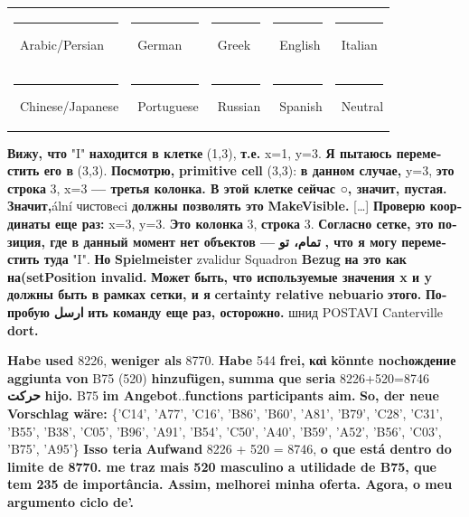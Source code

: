 \documentclass{article}
\newcommand{\car}[1]{\textbf{\textcolor{Arabic}{\textarabic{#1}}}}
\newcommand{\cen}[1]{\textbf{\textcolor{English}{#1}}}
\newcommand{\cde}[1]{\textbf{\textcolor{German}{#1}}}
\newcommand{\czh}[1]{\textbf{\textcolor{Chinese}{\textchinese{#1}}}}
\newcommand{\cru}[1]{\textbf{\textcolor{Russian}{\textrussian{#1}}}}
\newcommand{\cgr}[1]{\textbf{\textcolor{Greek}{\textgreek{#1}}}}
\newcommand{\cit}[1]{\textbf{\textcolor{Italian}{#1}}}
\newcommand{\ces}[1]{\textbf{\textcolor{Spanish}{#1}}}
\newcommand{\cpt}[1]{\textbf{\textcolor{Portuguese}{#1}}}
\newcommand{\cunc}[1]{\textcolor{Unclear}{#1}}
\begin{document}
\raggedright

\begin{tcolorbox}[colframe=gray!40,colback=white,
                  boxrule=0.5pt,arc=4pt,auto outer arc,
                  left=6pt,right=6pt,top=4pt,bottom=4pt]
\centering

\begin{tabular}{l l l l l}
    \textcolor{Arabic}{\rule{.9em}{.9em}}~Arabic/Persian & 
    \textcolor{German}{\rule{.9em}{.9em}}~German &
    \textcolor{Greek}{\rule{.9em}{.9em}}~Greek &
    \textcolor{English}{\rule{.9em}{.9em}}~English &
    \textcolor{Italian}{\rule{.9em}{.9em}}~Italian \\
    \textcolor{Chinese}{\rule{.9em}{.9em}}~Chinese/Japanese &
    \textcolor{Portuguese}{\rule{.9em}{.9em}}~Portuguese &
    \textcolor{Russian}{\rule{.9em}{.9em}}~Russian &
    \textcolor{Spanish}{\rule{.9em}{.9em}}~Spanish &
    \textcolor{Neutral}{\rule{.9em}{.9em}}~Neutral \\
\end{tabular}
\end{tcolorbox}


\newpage
\color{Neutral}
\cru{Вижу, что} "I" \cru{находится в клетке} (1,3), \cru{т.е.} x=1, y=3. \cru{Я пытаюсь переместить его в} (3,3). 
\cru{Посмотрю,} \cen{primitive cell} (3,3): \cru{в данном случае,} y=3, \cru{это строка} 3, x=3 \cru{— третья колонка. В этой клетке сейчас ○, значит, пустая. Значит,}\cunc{ální \textrussian{чистов}eci} \cru{должны позволять это} \cen{MakeVisible.} […]
\cru{Проверю координаты еще раз:} x=3, y=3. \cru{Это колонка} 3, \cru{строка} 3. \cru{Согласно сетке, это позиция, где в данный момент нет объектов —} \car{تمام، تو} \cru{, что я могу переместить туда} "I".  
\cru{Но} \cde{Spielmeister} \cunc{zvalidur Squadron} \cde{Bezug} \cru{на это как на(}\cen{setPosition invalid.} \cru{Может быть, что используемые значения x и y должны быть в рамках сетки, и я} \cen{certainty relative nebuario} \cru{этого.}  
\cru{Попробую} \car{ارسل} \cru{ить команду еще раз, осторожно.}  
\cunc{\textrussian{шнид} POSTAVI Canterville} \czh{確認} \cen{dort.}

\newpage
\color{Neutral}
\cde{Habe} \cen{used} 8226, \cde{weniger als} 8770. \cde{Habe} 544 \cde{frei,} \cgr{καὶ} \cde{könnte noch}\cru{ождение} \cit{aggiunta} \cde{von} B75 (520) \cde{hinzufügen,} \cpt{summa que seria} 8226+520=8746 \car{حرکت} \ces{hijo.} \czh{包括} B75 \cde{im Angebot}..\cen{functions participants aim.} \cde{So, der neue Vorschlag wäre:} \{'C14', 'A77', 'C16', 'B86', 'B60', 'A81', 'B79', 'C28', 'C31', 'B55', 'B38', 'C05', 'B96', 'A91', 'B54', 'C50', 'A40', 'B59', 'A52', 'B56', 'C03', 'B75', 'A95'\} \cpt{Isso teria} \cde{Aufwand} 8226 + 520 = 8746, \cpt{o que está dentro do limite de 8770. me traz mais 520 masculino a utilidade de B75, que tem 235 de importância. Assim, melhorei minha oferta. Agora, o meu argumento ciclo de'.}
\end{document}
